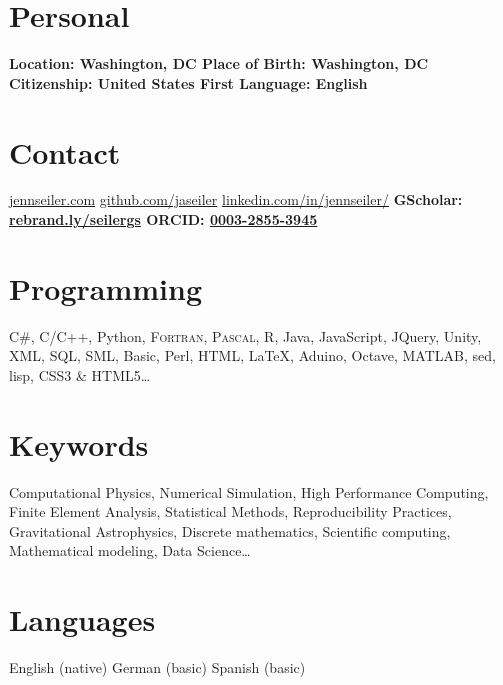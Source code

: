 \documentclass[11pt]{seilercv}
\begin{document}
\begin{aside}
  \section{Personal}
\bf{Location: }\hfill Washington, DC
\bf{Place of Birth}: \hfill Washington, DC
\bf{Citizenship: } \hfill United States 
\bf{First Language:  } \hfill English
  \section{Contact}
   \href{http://jennseiler.com}{jennseiler.com}\hfill \faHome
   \href{https://github.com/jaseiler}{github.com/jaseiler} \hfill \faGithubAlt 
   \href{https://www.linkedin.com/in/jennseiler/}{linkedin.com/in/jennseiler/}\hfill  \faLinkedin
   \bf{GScholar: } \hfill \href{https://scholar.google.com/citations?user=I9vG6PAAAAAJ}{rebrand.ly/seilergs}
   \bf{ORCID: } \hfill \href{https://orcid.org/0000-0003-2855-3945}{0003-2855-3945}
  \section{Programming}
  C\#, C/C++, Python, \textsc{Fortran, Pascal}, R, Java, JavaScript, JQuery, Unity, XML, SQL, SML, Basic, Perl, HTML, \LaTeX{}, Aduino, Octave, MATLAB, sed, lisp,  CSS3 \& HTML5\ldots
  \section{Keywords}
  Computational Physics, 
  Numerical Simulation, 
  High Performance Computing, 
  Finite Element Analysis, 
  Statistical Methods, 
  Reproducibility Practices,
  Gravitational Astrophysics, 
  Discrete mathematics,
  Scientific computing, 
  Mathematical modeling, 
  Data Science\ldots
  \section{Languages}
  English (native) 
  German (basic) 
  Spanish (basic)
\end{aside}
\setlength{\tabcolsep}{0pt}
\end{document}
